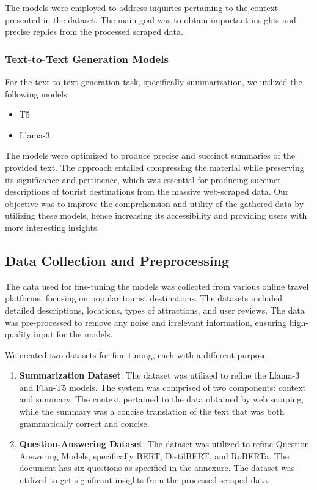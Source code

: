 \documentclass[conference]{IEEEtran}
\begin{document}
        The models were employed to address inquiries pertaining to the context presented in the dataset. The main goal was to obtain important insights and precise replies from the processed scraped data.

        \subsubsection{Text-to-Text Generation Models}

        For the text-to-text generation task, specifically summarization, we utilized the following models:
        \begin{itemize}
            \item T5
            \item Llama-3
        \end{itemize}

        The models were optimized to produce precise and succinct summaries of the provided text. The approach entailed compressing the material while preserving its significance and pertinence, which was essential for producing succinct descriptions of tourist destinations from the massive web-scraped data.
        Our objective was to improve the comprehension and utility of the gathered data by utilizing these models, hence increasing its accessibility and providing users with more interesting insights.

    \subsection{Data Collection and Preprocessing}

        The data used for fine-tuning the models was collected from various online travel platforms, focusing on popular tourist destinations. The datasets included detailed descriptions, locations, types of attractions, and user reviews. The data was pre-processed to remove any noise and irrelevant information, ensuring high-quality input for the models.

        We created two datasets for fine-tuning, each with a different purpose:

        \begin{enumerate}
            \item \textbf{Summarization Dataset}: The dataset was utilized to refine the Llama-3 and Flan-T5 models. The system was comprised of two components: context and summary. The context pertained to the data obtained by web scraping, while the summary was a concise translation of the text that was both grammatically correct and concise.
            \item \textbf{Question-Answering Dataset}: The dataset was utilized to refine Question-Answering Models, specifically BERT, DistilBERT, and RoBERTa. The document has six questions as specified in the annexure. The dataset was utilized to get significant insights from the processed scraped data.
        \end{enumerate}
\end{document}

